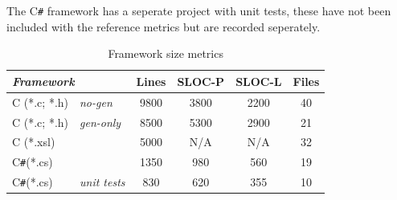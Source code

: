 \documentclass[twoside,openright]{uva-bachelor-thesis}
\newcommand{\cs}{C\texttt{\#}\xspace}
\begin{document}
		The \cs framework has a seperate project with unit tests, these have not been included with the reference metrics but are recorded seperately.
				
		\begin{table}[h]
			\centering
			\bgroup
			\def\arraystretch{1.25}
			\begin{tabular}{|ll|c|c|c|c|}
				\hline
				\multicolumn{2}{|l|}{{\it Framework}} & \multicolumn{1}{l|}{{\bf Lines}} & \multicolumn{1}{l|}{{\bf SLOC-P}} & \multicolumn{1}{l|}{{\bf SLOC-L}} & \multicolumn{1}{l|}{{\bf Files}} \\ \hline
				C (*.c; *.h) & {\it no-gen} & 9800 & 3800 & 2200 & 40 \\ \hline
				C (*.c; *.h) & {\it gen-only} & 8500 & 5300 & 2900 & 21 \\ \hline
				\multicolumn{2}{|l|}{C (*.xsl)} & 5000 & N/A & N/A & 32 \\ \hline
				\multicolumn{2}{|l|}{\cs (*.cs)} & 1350 & 980 & 560 & 19 \\ \hline
				\cs (*.cs) & {\it unit tests} & 830 & 620 & 355 & 10 \\ \hline
			\end{tabular}
			\egroup
			\caption{Framework size metrics}
			\label{locmetrics}
		\end{table}
		
\end{document}
